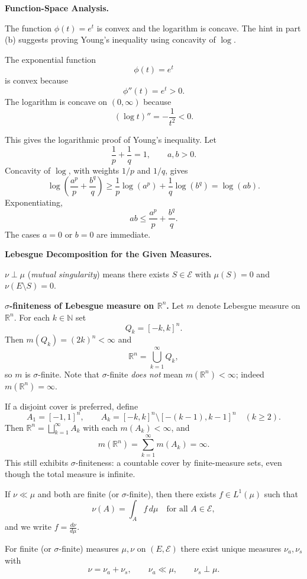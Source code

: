 \begin{problem}[CP-II-0537]
\label{prob:cp-ii-0537}
\textbf{Function-Space Analysis.}

\hspace*{1.5em}The function $\phi(t)=e^t$ is convex and the logarithm is concave.
	The hint in part (b) suggests proving Young's inequality using
	concavity of $\log$.
\end{problem}

\begin{solution}
The exponential function
\[
\phi(t)=e^t
\]
is convex because
\[
\phi''(t)=e^t>0.
\]
The logarithm is concave on \((0,\infty)\) because
\[
(\log t)''
=
-\frac1{t^2}<0.
\]

This gives the logarithmic proof of Young's inequality. Let
\[
\frac1p+\frac1q=1,
\qquad
a,b>0.
\]
Concavity of \(\log\), with weights \(1/p\) and \(1/q\), gives
\[
\log\left(
\frac{a^p}{p}+\frac{b^q}{q}
\right)
\ge
\frac1p\log(a^p)
+
\frac1q\log(b^q)
=
\log(ab).
\]
Exponentiating,
\[
\boxed{
ab
\le
\frac{a^p}{p}
+
\frac{b^q}{q}.
}
\]
The cases \(a=0\) or \(b=0\) are immediate.
\end{solution}


\begin{problem}[CP-II-0538]
\label{prob:cp-ii-0538}
\textbf{Lebesgue Decomposition for the Given Measures.}

\hspace*{1.5em}$\nu\perp\mu$ (\emph{mutual singularity}) means there exists $S\in\mathcal E$ with $\mu(S)=0$ and $\nu(E\setminus S)=0$.

	\par\medskip\noindent\textbf{$\sigma$-finiteness of Lebesgue measure on $\mathbb{R}^n$.}\quad
	Let $m$ denote Lebesgue measure on $\mathbb{R}^n$. For each $k\in\mathbb{N}$ set
	\[
	Q_k=[-k,k]^n.
	\]
	Then $m(Q_k)=(2k)^n<\infty$ and
	\[
	\mathbb{R}^n=\bigcup_{k=1}^\infty Q_k,
	\]
	so $m$ is $\sigma$-finite. Note that $\sigma$-finite \emph{does not} mean $m(\mathbb{R}^n)<\infty$; indeed $m(\mathbb{R}^n)=\infty$.

	\medskip

	If a disjoint cover is preferred, define
	\[
	A_1=[-1,1]^n,\qquad
	A_k=[-k,k]^n\setminus[-(k-1),k-1]^n\quad (k\ge2).
	\]
	Then $\mathbb{R}^n=\bigsqcup_{k=1}^\infty A_k$ with each $m(A_k)<\infty$, and
	\[
	m(\mathbb{R}^n)=\sum_{k=1}^\infty m(A_k)=\infty.
	\]
	This still exhibits $\sigma$-finiteness: a countable cover by finite-measure sets, even though the total measure is infinite.

	\bigskip

	If $\nu\ll\mu$ and both are finite (or $\sigma$-finite), then there exists $f\in L^1(\mu)$ such that
	\[
	\nu(A)=\int_A f\,d\mu \quad \text{for all }A\in\mathcal E,
	\]
	and we write $f=\frac{d\nu}{d\mu}$.

	\bigskip

	For finite (or $\sigma$-finite) measures $\mu,\nu$ on $(E,\mathcal E)$ there exist unique measures
	$\nu_a,\nu_s$ with
	\[
	\nu=\nu_a+\nu_s,\qquad \nu_a\ll\mu,\qquad \nu_s\perp\mu.
	\]

	\bigskip
\end{problem}

